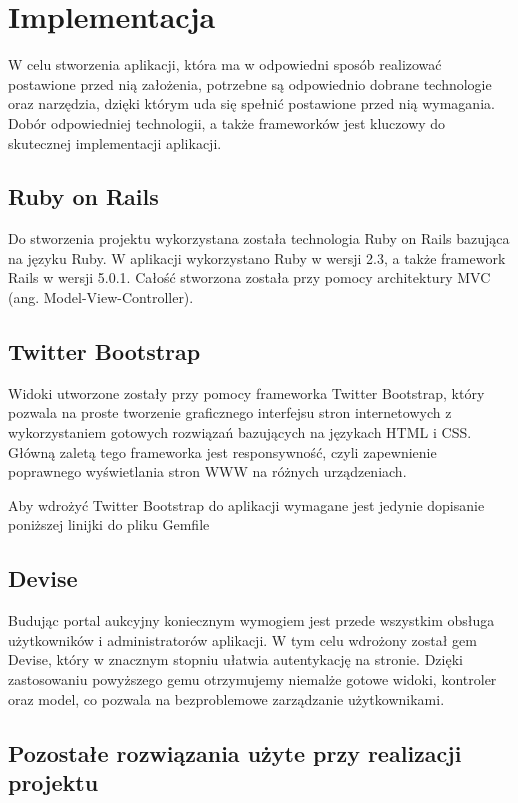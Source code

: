 \documentclass[brudnopis]{xmgr}
\begin{document}
\chapter{Implementacja}
W celu stworzenia aplikacji, która ma w odpowiedni sposób realizować postawione przed nią
założenia, potrzebne są odpowiednio dobrane technologie oraz narzędzia, dzięki którym uda się
spełnić postawione przed nią wymagania. Dobór odpowiedniej technologii, a także frameworków
jest kluczowy do skutecznej implementacji aplikacji.

\section{Ruby on Rails}
Do stworzenia projektu wykorzystana została technologia Ruby on Rails bazująca na języku Ruby.
W aplikacji wykorzystano Ruby w wersji 2.3, a także framework Rails w wersji 5.0.1. Całość stworzona
została przy pomocy architektury MVC (ang. Model-View-Controller).

\section{Twitter Bootstrap}
Widoki utworzone zostały przy pomocy frameworka Twitter Bootstrap, który pozwala na proste tworzenie
graficznego interfejsu stron internetowych z wykorzystaniem gotowych rozwiązań bazujących na językach
HTML i CSS. Główną zaletą tego frameworka jest responsywność, czyli zapewnienie poprawnego wyświetlania
stron WWW na różnych urządzeniach.

Aby wdrożyć Twitter Bootstrap do aplikacji wymagane jest jedynie dopisanie poniższej linijki do pliku Gemfile

\section{Devise}

Budując portal aukcyjny koniecznym wymogiem jest przede wszystkim obsługa użytkowników i administratorów aplikacji. W tym celu wdrożony został gem Devise, który w znacznym stopniu ułatwia autentykację na stronie. Dzięki zastosowaniu powyższego gemu otrzymujemy niemalże gotowe widoki, kontroler oraz model, co pozwala na bezproblemowe zarządzanie użytkownikami.

\section{Pozostałe rozwiązania użyte przy realizacji projektu}
\end{document}
